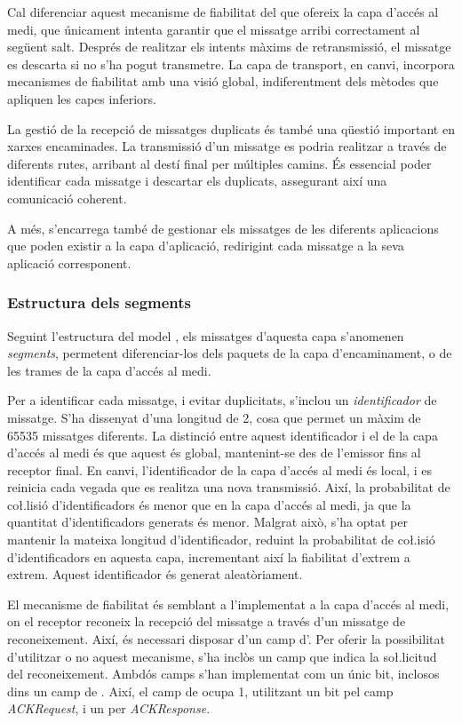 \documentclass{tfgitic}[2024/07/01]
\begin{document}
{Cal diferenciar aquest mecanisme de fiabilitat del que ofereix la capa d'accés al medi, que únicament intenta garantir que el missatge arribi correctament al següent salt. Després de realitzar els intents màxims de retransmissió, el missatge es descarta si no s'ha pogut transmetre. La capa de transport, en canvi, incorpora mecanismes de fiabilitat amb una visió global, indiferentment dels mètodes que apliquen les capes inferiors.

La gestió de la recepció de missatges duplicats és també una qüestió important en xarxes encaminades. La transmissió d'un missatge es podria realitzar a través de diferents rutes, arribant al destí final per múltiples camins. És essencial poder identificar cada missatge i descartar els duplicats, assegurant així una comunicació coherent. 

A més, s'encarrega també de gestionar els missatges de les diferents aplicacions que poden existir a la capa d'aplicació, redirigint cada missatge a la seva aplicació corresponent.


\subsubsection{Estructura dels segments}
Seguint l'estructura del model , els missatges d'aquesta capa s'anomenen \emph{segments}, permetent diferenciar-los dels paquets de la capa d'encaminament, o de les trames de la capa d'accés al medi. 

Per a identificar cada missatge, i evitar duplicitats, s'inclou un \emph{identificador} de missatge. S'ha dissenyat d'una longitud de \SI{2}{\byte}, cosa que permet un màxim de \num{65535} missatges diferents. La distinció entre aquest identificador i el de la capa d'accés al medi és que aquest és global, mantenint-se des de l'emissor fins al receptor final. En canvi, l'identificador de la capa d'accés al medi és local, i es reinicia cada vegada que es realitza una nova transmissió. Així, la probabilitat de co\l.lisió d'identificadors és menor que en la capa d'accés al medi, ja que la quantitat d'identificadors generats és menor. Malgrat això, s'ha optat per mantenir la mateixa longitud d'identificador, reduint la probabilitat de co\l.isió d'identificadors en aquesta capa, incrementant així la fiabilitat d'extrem a extrem. Aquest identificador és generat aleatòriament.

El mecanisme de fiabilitat és semblant a l'implementat a la capa d'accés al medi, on el receptor reconeix la recepció del missatge a través d'un missatge de reconeixement. Així, és necessari disposar d'un camp d'. Per oferir la possibilitat d'utilitzar o no aquest mecanisme, s'ha inclòs un camp que indica la so\l.licitud del reconeixement. Ambdós camps s'han implementat com un únic bit, inclosos dins un camp de . Així, el camp de  ocupa \SI{1}{\byte}, utilitzant un bit pel camp \emph{ACKRequest}, i un per \emph{ACKResponse}.

}
\end{document}
